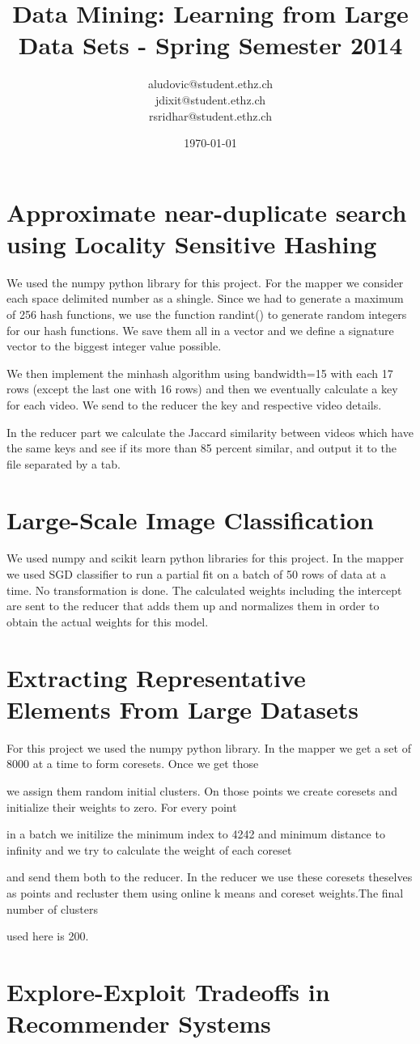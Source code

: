 \documentclass[a4paper, 11pt]{article}
\title{Data Mining: Learning from Large Data Sets - Spring Semester 2014}
\author{aludovic@student.ethz.ch\\ jdixit@student.ethz.ch\\ rsridhar@student.ethz.ch\\}
\date{\today}
\begin{document}
\maketitle

\section{Approximate near-duplicate search using Locality Sensitive Hashing} 

We used the numpy python library for this project. For the mapper we consider each space delimited number as a shingle. Since we had to generate a maximum of 256 hash functions, we use the function randint() to generate random integers for our hash functions. We save them all in a vector and we define a signature vector to the biggest integer value possible.

We then implement the minhash algorithm using bandwidth=15 with each 17 rows (except the last one with 16 rows) and then we eventually calculate a key for each video. We send to the reducer the key and respective video details.

In the reducer part we calculate the Jaccard similarity between videos which have the same keys and see if its more than 85 percent similar, and output it to the file separated by a tab.



\section{Large-Scale Image Classification}

We used numpy and scikit learn python libraries for this project. In the mapper we used SGD classifier to run a partial fit on a batch of 50 rows of data at a time. No transformation is done. The calculated weights including the intercept are sent to the reducer that adds them up and normalizes them in order to obtain the actual weights for this model.

\section{Extracting Representative Elements From Large Datasets}

For this project we used the numpy python library. In the mapper we get a set of 8000 at a time to form coresets. Once we get those

we assign them random initial clusters. On those points we create coresets and initialize their weights to zero. For every point

in a batch we initilize the minimum index to 4242 and minimum distance to infinity and we try to calculate the weight of each coreset

and send them both to the reducer. In the reducer we use these coresets theselves as points and recluster them using online k means and coreset weights.The final number of clusters

used here is 200.

\section{Explore-Exploit Tradeoffs in Recommender Systems}
\end{document}
